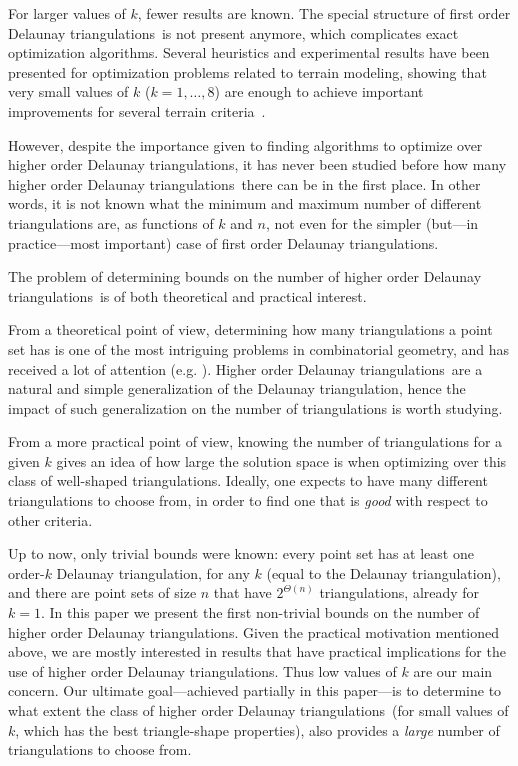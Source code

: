 \documentclass {journal}
\newcommand {\hodts}{higher order Delaunay triangulations}
\newcommand {\Hodts}{Higher order Delaunay triangulations}
\newcommand {\fodts}{first order Delaunay triangulations}
\begin{document}
For larger values of $k$, fewer results are known.
The special structure of \fodts\ is not present anymore, which complicates exact optimization algorithms.
Several heuristics and experimental results have been presented for optimization problems related to terrain modeling,
showing that very small values of $k$ ($k=1,\ldots,8$) are enough to achieve important improvements for several terrain criteria~\cite{bg-drthodt-08,bg-sfthodt-08,kkl-grtho-07}.

However, despite the importance given to finding algorithms to
optimize over \hodts, it has never been studied before how many
\hodts\ there can be in the first place. In other words, it is not
known what the minimum and maximum number of different
triangulations are, as functions of $k$ and $n$, not even for the
simpler (but---in practice---most important) case of \fodts.

The problem of determining bounds on the number of \hodts\ is of
both theoretical and practical interest.

From a theoretical point of view, determining how many triangulations a point set has is one of the most intriguing problems in combinatorial geometry, and has received a lot of attention (e.g. \cite{ahhhk-npg-06,sw-rtpps-06,ss-bubnt-03}).
\Hodts\ are a natural and simple generalization of the Delaunay triangulation, hence the impact of such generalization on the number of triangulations is worth studying.

From a more practical point of view, knowing the number of
triangulations for a given $k$ gives an idea of how large the
solution space is when optimizing over this class of well-shaped
triangulations. Ideally, one expects to have many different
triangulations to choose from, in order to find one that is
\emph{good} with respect to other criteria.

Up to now, only trivial bounds were known: every point set has at
least one order-$k$ Delaunay triangulation, for any $k$ (equal to
the Delaunay triangulation), and there are point sets of size $n$
that have $2^{\Theta(n)}$ triangulations, already for $k=1$. In
this paper we present the first non-trivial bounds on the number
of \hodts. Given the practical motivation mentioned above, we are
mostly interested in results that have practical implications for
the use of \hodts. Thus low values of $k$ are our main concern.
Our ultimate goal---achieved partially in this paper---is to
determine to what extent the class of \hodts\ (for small values of
$k$, which has the best triangle-shape properties), also provides
a \emph{large} number of triangulations to choose from.
\end{document}
